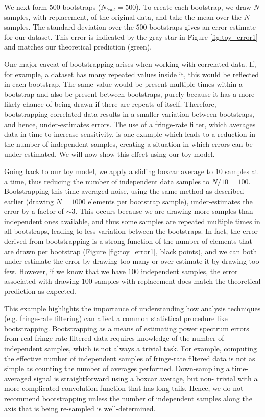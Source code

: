 \documentclass[preprint2,numberedappendix,tighten]{aastex6}  %
\begin{document}
We next form $500$ bootstraps ($N_{boot} = 500$). To create each bootstrap, we draw $N$ samples, with replacement, of the 
original data, and take the mean over the $N$ samples. The standard deviation over the $500$ bootstraps gives an error 
estimate for our dataset. This error is indicated by the gray star in Figure \ref{fig:toy_error1} and matches our theoretical 
prediction (green).

One major caveat of bootstrapping arises when working with correlated data. If, for example, a dataset has many repeated 
values inside it, this would be reflected in each bootstrap. The same value would be present multiple times within a bootstrap 
and also be present between bootstraps, purely because it has a more likely chance of being drawn if there are repeats of 
itself. Therefore, bootstrapping correlated data results in a smaller variation between bootstraps, and hence, under-estimates 
errors. The use of a fringe-rate filter, which averages data in time to increase sensitivity, is one example which leads to a 
reduction in the number of independent samples, creating a situation in which errors can be under-estimated. We will now show 
this effect using our toy model.

Going back to our toy model, we apply a sliding boxcar average to $10$ samples at a time, thus reducing the number of 
independent data samples to $N/10 = 100$. Bootstrapping this time-averaged noise, using the same method as described 
earlier (drawing $N=1000$ elements per bootstrap sample), under-estimates the error by a factor of $\sim3$. This occurs 
because we are drawing more samples than independent ones available, and thus some samples are repeated multiple times 
in all bootstraps, leading to less variation between the bootstraps. In fact, the error derived from bootstrapping is a strong 
function of the number of elements that are drawn per bootstrap (Figure \ref{fig:toy_error1}, black points), and we can both 
under-estimate the error by drawing too many or over-estimate it by drawing too few. However, if we know that we have $100$ 
independent samples, the error associated with drawing $100$ samples with replacement does match the theoretical prediction 
as expected.

This example highlights the importance of understanding how analysis techniques (e.g. fringe-rate filtering) can affect a 
common statistical procedure like bootstrapping. Bootstrapping as a means of estimating power spectrum errors from real 
fringe-rate filtered data requires knowledge of the number of independent samples, which is not always a trivial task. For 
example, computing the effective number of independent samples of fringe-rate filtered data is not as simple as counting the 
number of averages performed. Down-sampling a time-averaged signal is straightforward using a boxcar average, but non-
trivial with a more complicated convolution function that has long tails. Hence, we do not recommend bootstrapping unless the 
number of independent samples along the axis that is being re-sampled is well-determined.
\end{document}
